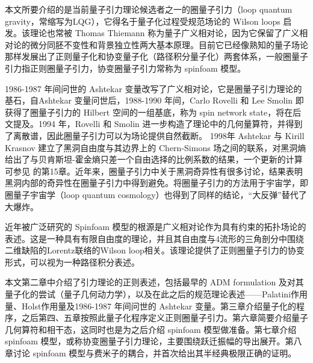 	本文所要介绍的是当前量子引力理论候选者之一的圈量子引力（loop quantum gravity，常缩写为LQG），它得名于量子化过程受规范场论的 Wilson loops 启发。该理论也常被 Thomas Thiemann 称为量子广义相对论\cite{Thiemann2007}，因为它保留了广义相对论的微分同胚不变性和背景独立性两大基本原理。目前它已经像熟知的量子场论那样发展出了正则量子化和协变量子化（路径积分量子化）两套体系，一般圈量子引力指正则圈量子引力，协变圈量子引力常称为 spinfoam 模型。

	1986-1987 年间问世的 Ashtekar 变量改写了广义相对论，它是圈量子引力理论的基石，自Ashtekar 变量问世后，1988-1990 年间，Carlo Rovelli 和 Lee Smolin 即获得了圈量子引力的 Hilbert 空间的一组基底\cite{Rovelli1988,Rovelli1989}，称为 spin network state，将在后文提及。1994 年，Rovelli 和 Smolin 进一步构造了理论中的几何量算符，并得到了离散谱\cite{Rovelli1994}，因此圈量子引力可以为场论提供自然截断。 1998年 Ashtekar 与 Kirill Krasnov 建立了黑洞自由度与其边界上的 Chern-Simons 场之间的联系，对黑洞熵给出了与贝肯斯坦-霍金熵只差一个自由选择的比例系数的结果\cite{Ashtekar:1998ue}，一个更新的计算可参见\cite{Thiemann2007} 的第15章。近年来，圈量子引力中关于黑洞奇异性有很多讨论\cite{Ashtekar:2018lag,Ashtekar:2018cay,Ashtekar:2005qt,Bohmer:2007wi,Olmedo:2017lvt}，结果表明黑洞内部的奇异性在圈量子引力中得到避免。将圈量子引力的方法用于宇宙学，即圈量子宇宙学（loop quantum cosmology）也得到了同样的结论，“大反弹”替代了大爆炸\cite{Ashtekar:2011ni}。

	近年被广泛研究的 Spinfoam 模型的根源是广义相对论作为具有约束的拓扑场论的表述\cite{Bianchi2017}。这是一种具有有限自由度的理论，并且其自由度与4流形的三角剖分中围绕二维缺陷的Lorentz联络的Wilson loop相关。该理论提供了正则圈量子引力的协变形式，可以视为一种路径积分表述。
	
	本文第二章中介绍了引力理论的正则表述，包括最早的 ADM formulation 及对其量子化的尝试（量子几何动力学），以及在此之后的规范理论表述——Palatini作用量、Holst作用量及1986-1987 年间问世的 Ashtekar 变量。第三章介绍量子化的程序，之后第四、五章按照此量子化程序定义正则圈量子引力。第六章简要介绍量子几何算符和相干态，这同时也是为之后介绍 spinfoam 模型做准备。第七章介绍 spinfoam 模型，或称协变圈量子引力理论，主要围绕跃迁振幅的导出展开。第八章讨论 spinfoam 模型与费米子的耦合，并首次给出其半经典极限正确的证明。
